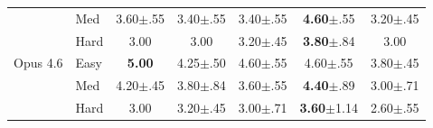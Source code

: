\documentclass{article}
\begin{document}
\begin{table}[t]
{\begin{tabular}{@{}llccccc@{}}
 & Med & 3.60$\pm$.55 & 3.40$\pm$.55 & 3.40$\pm$.55 & \textbf{4.60}$\pm$.55 & 3.20$\pm$.45 \\
 & Hard & 3.00 & 3.00 & 3.20$\pm$.45 & \textbf{3.80}$\pm$.84 & 3.00 \\
\midrule
Opus 4.6 & Easy & \textbf{5.00} & 4.25$\pm$.50 & 4.60$\pm$.55 & 4.60$\pm$.55 & 3.80$\pm$.45 \\
 & Med & 4.20$\pm$.45 & 3.80$\pm$.84 & 3.60$\pm$.55 & \textbf{4.40}$\pm$.89 & 3.00$\pm$.71 \\
 & Hard & 3.00 & 3.20$\pm$.45 & 3.00$\pm$.71 & \textbf{3.60}$\pm$1.14 & 2.60$\pm$.55 \\
\bottomrule
\end{tabular}
}
\end{table}
\end{document}

